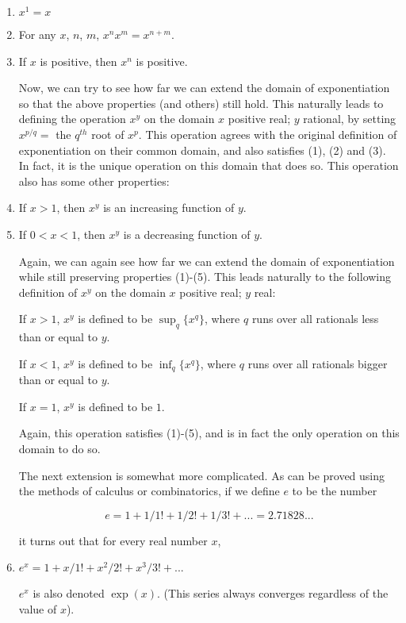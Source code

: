 \begin{enumerate}
  \item $x^1 = x$
  \item For any $x$, $n$, $m$, $x^n x^m = x^{n+m}$.
  \item If $x$ is positive, then $x^n$ is positive.

  Now, we can try to see how far we can extend the domain of
  exponentiation so that the above properties (and others) still hold.
  This naturally leads to defining the operation $x^y$ on the domain
  {$x$ positive real; $y$ rational}, by setting $x^{p/q} =$ the $q^{th}$
  root of $x^p$.  This operation agrees with the original definition of
  exponentiation on their common domain, and also satisfies (1), (2) and
  (3).  In fact, it is the unique operation on this domain that does so.
  This operation also has some other properties:

  \item If $x>1$, then $x^y$ is an increasing function of $y$.
  \item If $0<x<1$, then $x^y$ is a decreasing function of $y$.

  Again, we can again see how far we can extend the domain of
  exponentiation while still preserving properties (1)-(5).  This leads
  naturally to the following definition of $x^y$ on the domain {$x$
    positive real; $y$ real}:

  If $x>1$, $x^y$ is defined to be $\sup_q\{ x^q\}$, where $q$ runs over
  all rationals less than or equal to $y$.

  If $x<1$, $x^y$ is defined to be $\inf_q\{ x^q\}$, where $q$ runs over
  all rationals bigger than or equal to $y$.

  If $x=1$, $x^y$ is defined to be $1$.

  Again, this operation satisfies (1)-(5), and is in fact the only
  operation on this domain to do so.

  The next extension is somewhat more complicated.  As can be proved
  using the methods of calculus or combinatorics, if we define $e$ to be
  the number

  \[e = 1 + 1/1! + 1/2! + 1/3! + ... = 2.71828...\]

  it turns out that for every real number $x$,

  \item $ e^x = 1 + x/1! + x^2/2! + x^3/3! + ...$

  $e^x$ is also denoted $\exp(x)$.  (This series always converges
  regardless of the value of $x$).


\end{enumerate}
